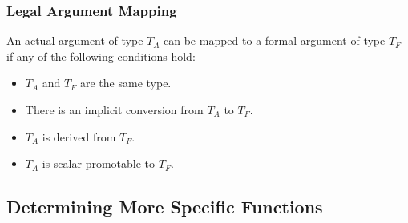 \subsubsection{Legal Argument Mapping}
\label{Legal_Argument_Mapping}

An actual argument of type $T_A$ can be mapped to a formal argument of
type $T_F$ if any of the following conditions hold:
\begin{itemize}
\item $T_A$ and $T_F$ are the same type.
\item There is an implicit conversion from $T_A$ to $T_F$.
\item $T_A$ is derived from $T_F$.
\item $T_A$ is scalar promotable to $T_F$.
\end{itemize}

\subsection{Determining More Specific Functions}
\label{Determining_More_Specific_Functions}

